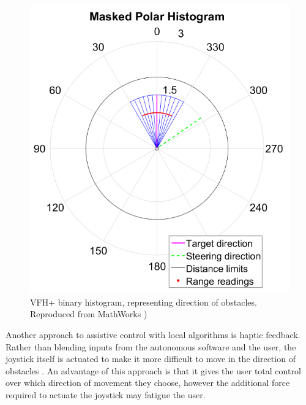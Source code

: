 \documentclass[12pt]{article}
\begin{document}
\begin{figure}[bp]
    \centering
    \includegraphics[width=0.4\linewidth]{images/binary_histogram_vfh.png}
    \caption{VFH+ binary histogram, representing direction of obstacles. Reproduced from MathWorks \cite{mathworksVectorFieldHistogram2022})}
    \label{fig:binary_histogram_vfh}
\end{figure}

Another approach to assistive control with local algorithms is haptic feedback. Rather than
blending inputs from the autonomous software and the user, the joystick itself is actuated
to make it more difficult to move in the direction of obstacles \cite{kondoNavigationGuidanceControl2008}\cite{vanderpoortenPoweredWheelchairNavigation2012}.
An advantage of this approach is that it gives the user total control over which direction of movement they choose,
however the additional force required to actuate the joystick may fatigue the user.





\pagebreak
\end{document}
